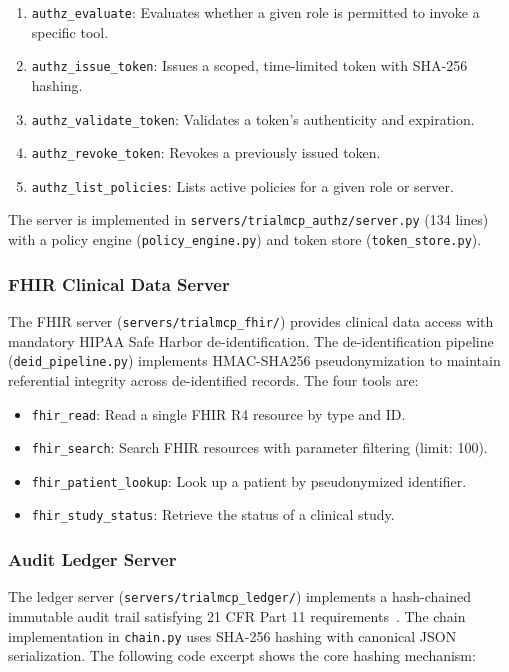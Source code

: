 \begin{enumerate}[leftmargin=*]
\item \texttt{authz\_evaluate}: Evaluates whether a given role is permitted to invoke a specific tool.
\item \texttt{authz\_issue\_token}: Issues a scoped, time-limited token with SHA-256 hashing.
\item \texttt{authz\_validate\_token}: Validates a token's authenticity and expiration.
\item \texttt{authz\_revoke\_token}: Revokes a previously issued token.
\item \texttt{authz\_list\_policies}: Lists active policies for a given role or server.
\end{enumerate}

The server is implemented in \texttt{servers/trialmcp\_authz/server.py} (134 lines) with a policy engine (\texttt{policy\_engine.py}) and token store (\texttt{token\_store.py}).

\subsubsection{FHIR Clinical Data Server}

The FHIR server (\texttt{servers/trialmcp\_fhir/}) provides clinical data access with mandatory HIPAA Safe Harbor de-identification. The de-identification pipeline (\texttt{deid\_pipeline.py}) implements HMAC-SHA256 pseudonymization to maintain referential integrity across de-identified records. The four tools are:

\begin{itemize}[leftmargin=*]
\item \texttt{fhir\_read}: Read a single FHIR R4 resource by type and ID.
\item \texttt{fhir\_search}: Search FHIR resources with parameter filtering (limit: 100).
\item \texttt{fhir\_patient\_lookup}: Look up a patient by pseudonymized identifier.
\item \texttt{fhir\_study\_status}: Retrieve the status of a clinical study.
\end{itemize}

\subsubsection{Audit Ledger Server}

The ledger server (\texttt{servers/trialmcp\_ledger/}) implements a hash-chained immutable audit trail satisfying 21 CFR Part 11 requirements~\cite{fda2003part11}. The chain implementation in \texttt{chain.py} uses SHA-256 hashing with canonical JSON serialization. The following code excerpt shows the core hashing mechanism:

